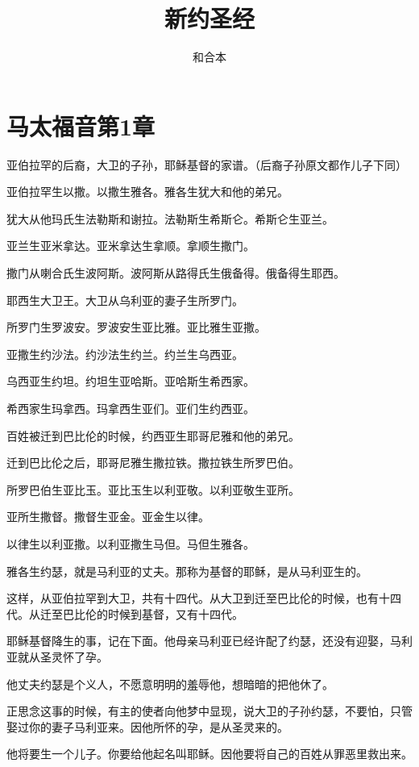 \documentclass[12pt,oneside]{book}
\title{新约圣经}
\author{和合本}
\begin{document}

\frontmatter


\setcounter{tocdepth}{2}    
\tableofcontents

\mainmatter

\chapter{马太福音第1章}

亚伯拉罕的后裔，大卫的子孙，耶稣基督的家谱。（后裔子孙原文都作儿子下同）

亚伯拉罕生以撒。以撒生雅各。雅各生犹大和他的弟兄。

犹大从他玛氏生法勒斯和谢拉。法勒斯生希斯仑。希斯仑生亚兰。

亚兰生亚米拿达。亚米拿达生拿顺。拿顺生撒门。

撒门从喇合氏生波阿斯。波阿斯从路得氏生俄备得。俄备得生耶西。

耶西生大卫王。大卫从乌利亚的妻子生所罗门。

所罗门生罗波安。罗波安生亚比雅。亚比雅生亚撒。

亚撒生约沙法。约沙法生约兰。约兰生乌西亚。

乌西亚生约坦。约坦生亚哈斯。亚哈斯生希西家。

希西家生玛拿西。玛拿西生亚们。亚们生约西亚。

百姓被迁到巴比伦的时候，约西亚生耶哥尼雅和他的弟兄。

迁到巴比伦之后，耶哥尼雅生撒拉铁。撒拉铁生所罗巴伯。

所罗巴伯生亚比玉。亚比玉生以利亚敬。以利亚敬生亚所。

亚所生撒督。撒督生亚金。亚金生以律。

以律生以利亚撒。以利亚撒生马但。马但生雅各。

雅各生约瑟，就是马利亚的丈夫。那称为基督的耶稣，是从马利亚生的。

这样，从亚伯拉罕到大卫，共有十四代。从大卫到迁至巴比伦的时候，也有十四代。从迁至巴比伦的时候到基督，又有十四代。

耶稣基督降生的事，记在下面。他母亲马利亚已经许配了约瑟，还没有迎娶，马利亚就从圣灵怀了孕。

他丈夫约瑟是个义人，不愿意明明的羞辱他，想暗暗的把他休了。

正思念这事的时候，有主的使者向他梦中显现，说大卫的子孙约瑟，不要怕，只管娶过你的妻子马利亚来。因他所怀的孕，是从圣灵来的。

他将要生一个儿子。你要给他起名叫耶稣。因他要将自己的百姓从罪恶里救出来。
\end{document}
